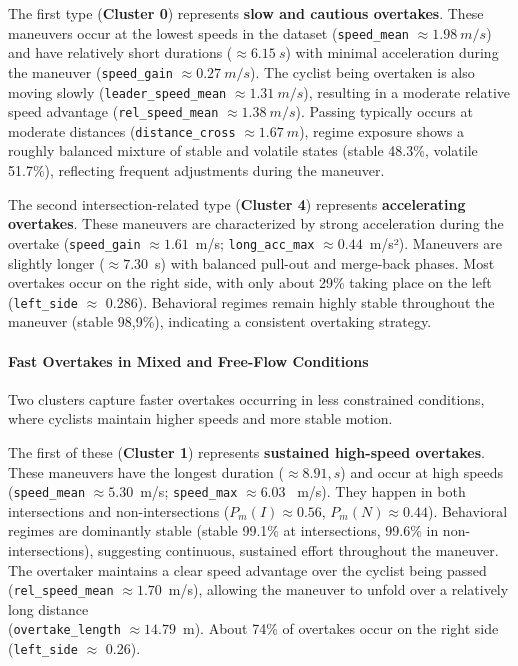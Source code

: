 The first type (\textbf{Cluster 0}) represents \textbf{slow and cautious overtakes}. These maneuvers occur at the lowest speeds in the dataset (\verb|speed_mean| $\approx 1.98~m/s$) and have relatively short durations ($\approx 6.15~s$) with minimal acceleration during the maneuver (\verb|speed_gain| $ \approx 0.27~m/s$). The cyclist being overtaken is also moving slowly (\verb|leader_speed_mean| $\approx 1.31~m/s$), resulting in a moderate relative speed advantage (\verb|rel_speed_mean| $\approx 1.38~m/s$). Passing typically occurs at moderate distances (\verb|distance_cross| $\approx 1.67~m$), regime exposure shows a roughly balanced mixture of stable and volatile states (stable 48.3\%, volatile 51.7\%), reflecting frequent adjustments during the maneuver.


The second intersection-related type (\textbf{Cluster 4}) represents \textbf{accelerating overtakes}. These maneuvers are characterized by strong acceleration during the overtake (\verb|speed_gain| $ \approx 1.61$~m/s; \verb|long_acc_max| $ \approx 0.44$~m/s²). Maneuvers are slightly longer ($\approx 7.30$~s) with balanced pull-out and merge-back phases. Most overtakes occur on the right side, with only about 29\% taking place on the left (\verb|left_side| $ \approx $ 0.286). Behavioral regimes remain highly stable throughout the maneuver (stable 98,9\%), indicating a consistent overtaking strategy. 


\paragraph{Fast Overtakes in Mixed and Free-Flow Conditions}

Two clusters capture faster overtakes occurring in less constrained conditions, where cyclists maintain higher speeds and more stable motion.

The first of these (\textbf{Cluster 1}) represents \textbf{sustained high-speed overtakes}. These maneuvers have the longest duration ($\approx 8.91,s$) and occur at high speeds (\verb|speed_mean| $\approx 5.30$~m/s; \verb|speed_max| $\approx 6.03$ ~m/s). They happen in both intersections and non-intersections ($P_m(I) \approx 0.56$, $P_m(N) \approx 0.44$). Behavioral regimes are dominantly stable (stable 99.1\% at intersections, 99.6\% in non-intersections), suggesting continuous, sustained effort throughout the maneuver. The overtaker maintains a clear speed advantage over the cyclist being passed (\verb|rel_speed_mean| $\approx 1.70$~m/s), allowing the maneuver to unfold over a relatively long distance \\(\verb|overtake_length| $\approx 14.79$~m). About 74\% of overtakes occur on the right side (\verb|left_side| $\approx $ 0.26).


